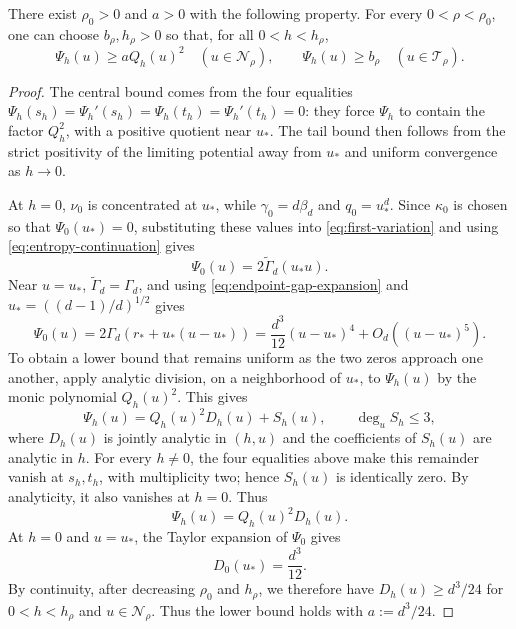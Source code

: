 \begin{lemma}
\label{lem:first-variation-bound}
There exist $\rho_0>0$ and $a>0$ with the following property.  For every
$0<\rho<\rho_0$, one can choose $b_\rho,h_\rho>0$ so that, for all
$0<h<h_\rho$,
\begin{equation*}
  \Psi_h(u)\ge a Q_h(u)^2
  \quad(u\in\mathcal N_\rho),
  \qquad
  \Psi_h(u)\ge b_\rho
  \quad(u\in\mathcal T_\rho).
\end{equation*}
\end{lemma}

\begin{proof}
The central bound comes from the four equalities
$\Psi_h(s_h)=\Psi_h'(s_h)=\Psi_h(t_h)=\Psi_h'(t_h)=0$: they force
$\Psi_h$ to contain the factor $Q_h^2$, with a positive quotient near $u_*$.
The tail bound then follows from the strict positivity of the limiting
potential away from $u_*$ and uniform convergence as $h\to0$.

At $h=0$, $\nu_0$ is concentrated at $u_*$, while $\gamma_0=d\beta_d$ and
$q_0=u_*^d$.  Since $\kappa_0$ is chosen so that
$\Psi_0(u_*)=0$, substituting these values into
\eqref{eq:first-variation} and using
\eqref{eq:entropy-continuation} gives
\begin{equation}\label{eq:endpoint-first-variation}
  \Psi_0(u)=2\widetilde\Gamma_d(u_*u).
\end{equation}
Near $u=u_*$, $\widetilde\Gamma_d=\Gamma_d$, and using
\eqref{eq:endpoint-gap-expansion} and
$u_*=((d-1)/d)^{1/2}$ gives
\begin{equation*}
  \Psi_0(u)
  =2\Gamma_d(r_*+u_*(u-u_*))
  =\frac{d^3}{12}(u-u_*)^4+O_d((u-u_*)^5).
\end{equation*}
To obtain a lower bound that remains uniform as the two zeros approach one
another, apply analytic division, on a neighborhood of $u_*$, to $\Psi_h(u)$
by the monic polynomial $Q_h(u)^2$.  This gives
\[
  \Psi_h(u)=Q_h(u)^2D_h(u)+S_h(u),
  \qquad \deg_uS_h\le3,
\]
where $D_h(u)$ is jointly analytic in $(h,u)$ and the coefficients of
$S_h(u)$ are analytic in $h$.  For every $h\ne0$, the four equalities above
make this remainder vanish at $s_h,t_h$, with multiplicity two;
hence $S_h(u)$ is identically zero.  By analyticity, it also vanishes at
$h=0$.  Thus
\[
  \Psi_h(u)=Q_h(u)^2D_h(u).
\]
At $h=0$ and $u=u_*$, the Taylor expansion of $\Psi_0$ gives
\[
  D_0(u_*)=\frac{d^3}{12}.
\]
By continuity, after decreasing $\rho_0$ and $h_\rho$, we therefore have
$D_h(u)\ge d^3/24$ for $0<h<h_\rho$ and $u\in\mathcal N_\rho$.  Thus the
lower bound holds with $a:=d^3/24$.


\end{proof}
